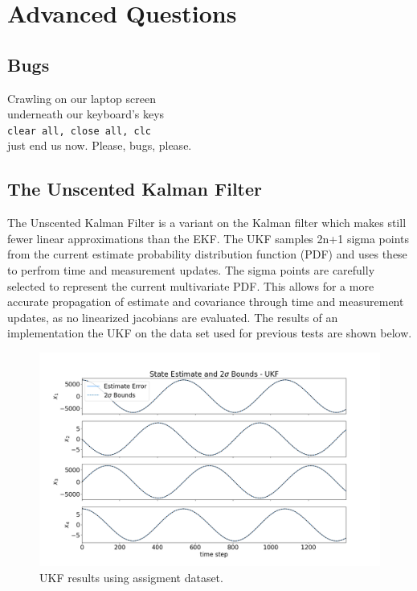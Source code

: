 \documentclass[11pt, a4paper]{article}
\begin{document}
\newpage

\section*{Advanced Questions}
\subsection{Bugs}
Crawling on our laptop screen \\
underneath our keyboard's keys \\
\texttt{clear all, close all, clc} \\
just end us now. Please, bugs, please. \\
 
\subsection{The Unscented Kalman Filter}
The Unscented Kalman Filter is a variant on the Kalman filter which makes still fewer linear approximations than the EKF. 
The UKF samples 2n+1 sigma points from the current estimate probability distribution function (PDF) and uses these to perfrom time and measurement updates.
The sigma points are carefully selected to represent the current multivariate PDF. 
This allows for a more accurate propagation of estimate and covariance through time and measurement updates, as no linearized jacobians are evaluated. 
The results of an implementation the UKF on the data set used for previous tests are shown below.

\begin{figure}[H]
	\centering
	\includegraphics[width=\textwidth]{Figures/ukf_dataset_est.png}
	\caption{UKF results using assigment dataset.}
	\label{fig:ukf_dataset}
\end{figure}
\end{document}
